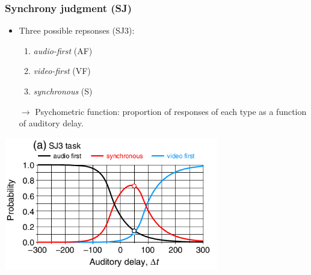 \documentclass[xcolor={fixpdftex,hyperref,x11names},10pt,pdftex,hyperref={pdftex}]{beamer}
\begin{document}
\begin{frame}
	\frametitle{Synchrony judgment (SJ)}

	\begin{itemize}
		\item Three possible repsonses (SJ3):
			\begin{enumerate}
				\item \textit{audio-first} (AF)
				\item \textit{video-first} (VF)
				\item \textit{synchronous} (S)
			\end{enumerate}

		\item[$\rightarrow$] Psychometric function: proportion of responses of
		 each type as a function of auditory delay.

	\end{itemize}
	

	\begin{center}
		\includegraphics[width=0.7\textwidth]{figs/SJ3-psychometric-function.png}
	\end{center}
\end{frame}




\end{document}
